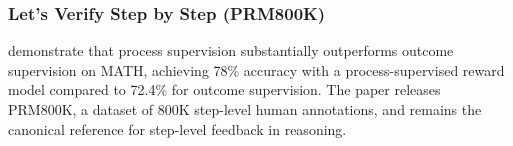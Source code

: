 \subsubsection{Let's Verify Step by Step (PRM800K)}

\autocite{lightman2023letsverifystepstep} demonstrate that
process supervision substantially outperforms outcome supervision on
MATH, achieving 78\% accuracy with a process-supervised reward model
compared to 72.4\% for outcome supervision.  The paper releases
PRM800K, a dataset of 800K step-level human annotations, and remains
the canonical reference for step-level feedback in reasoning.







